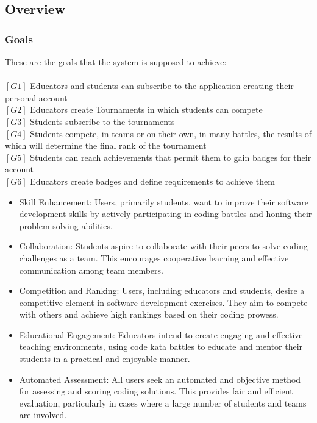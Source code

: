 \documentclass{article}
\begin{document}
\subsection{Overview}
\subsubsection{Goals}
These are the goals that the system is supposed to achieve:\\\\
$[G1]$ Educators and students can subscribe to the application creating their personal account \\
$[G2]$ Educators create Tournaments in which students can compete \\
$[G3]$ Students subscribe to the tournaments \\
$[G4]$ Students compete, in teams or on their own, in many battles, the results of which will determine the final rank of the tournament  \\
$[G5]$ Students can reach achievements that permit them to gain badges for their account \\
$[G6]$ Educators create badges and define requirements to achieve them \\
\begin{itemize}
\item Skill Enhancement: Users, primarily students, want to improve their software development skills by actively participating in coding battles and honing their problem-solving abilities. 

\item Collaboration: Students aspire to collaborate with their peers to solve coding challenges as a team. This encourages cooperative learning and effective communication among team members.

\item Competition and Ranking: Users, including educators and students, desire a competitive element in software development exercises. They aim to compete with others and achieve high rankings based on their coding prowess.

\item Educational Engagement: Educators intend to create engaging and effective teaching environments, using code kata battles to educate and mentor their students in a practical and enjoyable manner.

\item Automated Assessment: All users seek an automated and objective method for assessing and scoring coding solutions. This provides fair and efficient evaluation, particularly in cases where a large number of students and teams are involved.

\end{itemize}
\newpage
\end{document}
